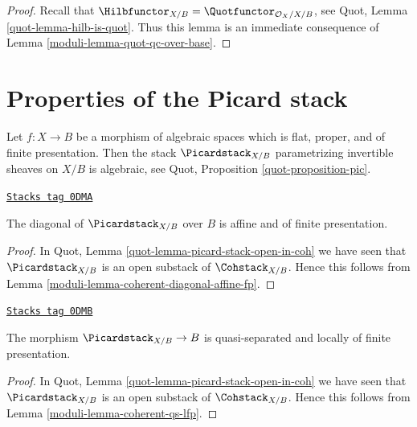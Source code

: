 \begin{proof}

Recall that $\Hilbfunctor_{X/B} = \Quotfunctor_{\mathcal{O}_X/X/B}$, see
Quot, Lemma \ref{quot-lemma-hilb-is-quot}.
Thus this lemma is an immediate consequence of
Lemma \ref{moduli-lemma-quot-qc-over-base}.
\end{proof}

\section{Properties of the Picard stack}
\label{moduli-section-picard-stack}
Let $f : X \to B$ be a morphism of algebraic spaces which is flat,
proper, and of finite presentation. Then the stack
$\Picardstack_{X/B}$ parametrizing invertible sheaves on $X/B$
is algebraic, see Quot, Proposition \ref{quot-proposition-pic}.

\begin{lemma}
\label{moduli-lemma-pic-diagonal-affine-fp}
\href{https://stacks.math.columbia.edu/tag/0DMA}{\texttt{Stacks tag 0DMA}}

The diagonal of $\Picardstack_{X/B}$ over $B$ is affine
and of finite presentation.
\end{lemma}

\begin{proof}

In Quot, Lemma \ref{quot-lemma-picard-stack-open-in-coh} we have seen that
$\Picardstack_{X/B}$ is an open substack of
$\Cohstack_{X/B}$. Hence this follows from
Lemma \ref{moduli-lemma-coherent-diagonal-affine-fp}.
\end{proof}

\begin{lemma}
\label{moduli-lemma-pic-qs-lfp}
\href{https://stacks.math.columbia.edu/tag/0DMB}{\texttt{Stacks tag 0DMB}}

The morphism $\Picardstack_{X/B} \to B$ is quasi-separated and
locally of finite presentation.
\end{lemma}

\begin{proof}

In Quot, Lemma \ref{quot-lemma-picard-stack-open-in-coh} we have seen that
$\Picardstack_{X/B}$ is an open substack of
$\Cohstack_{X/B}$. Hence this follows from
Lemma \ref{moduli-lemma-coherent-qs-lfp}.
\end{proof}

